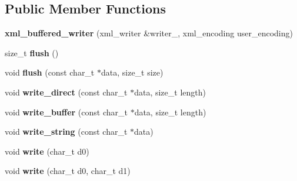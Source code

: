 \subsection*{Public Member Functions}
\begin{DoxyCompactItemize}
\item 
\hypertarget{classxml__buffered__writer_a3c22ad246e2aebb6597935baf4a223a7}{{\bfseries xml\+\_\+buffered\+\_\+writer} (xml\+\_\+writer \&writer\+\_\+, xml\+\_\+encoding user\+\_\+encoding)}\label{classxml__buffered__writer_a3c22ad246e2aebb6597935baf4a223a7}

\item 
\hypertarget{classxml__buffered__writer_a4789b8661f9ff4e5e4bb4226f7d45997}{size\+\_\+t {\bfseries flush} ()}\label{classxml__buffered__writer_a4789b8661f9ff4e5e4bb4226f7d45997}

\item 
\hypertarget{classxml__buffered__writer_aa733cb2cd0d5fcacec92c67a7f26c553}{void {\bfseries flush} (const char\+\_\+t $\ast$data, size\+\_\+t size)}\label{classxml__buffered__writer_aa733cb2cd0d5fcacec92c67a7f26c553}

\item 
\hypertarget{classxml__buffered__writer_a119f9db2f60e578e69ac81177e932fb3}{void {\bfseries write\+\_\+direct} (const char\+\_\+t $\ast$data, size\+\_\+t length)}\label{classxml__buffered__writer_a119f9db2f60e578e69ac81177e932fb3}

\item 
\hypertarget{classxml__buffered__writer_ae62b84beff660555acb76e277f967c0d}{void {\bfseries write\+\_\+buffer} (const char\+\_\+t $\ast$data, size\+\_\+t length)}\label{classxml__buffered__writer_ae62b84beff660555acb76e277f967c0d}

\item 
\hypertarget{classxml__buffered__writer_a1699556c38e942f7c1db1b98ddf15642}{void {\bfseries write\+\_\+string} (const char\+\_\+t $\ast$data)}\label{classxml__buffered__writer_a1699556c38e942f7c1db1b98ddf15642}

\item 
\hypertarget{classxml__buffered__writer_a1aa829bd551a69dd9005d2d46063308f}{void {\bfseries write} (char\+\_\+t d0)}\label{classxml__buffered__writer_a1aa829bd551a69dd9005d2d46063308f}

\item 
\hypertarget{classxml__buffered__writer_a4cd6e908908e17c9b07eba34f7317791}{void {\bfseries write} (char\+\_\+t d0, char\+\_\+t d1)}\label{classxml__buffered__writer_a4cd6e908908e17c9b07eba34f7317791}


\end{DoxyCompactItemize}
